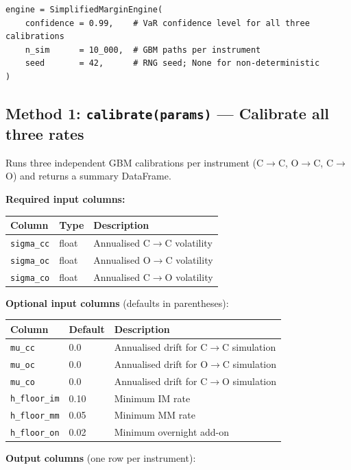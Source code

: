 \documentclass[9pt, a4paper]{extarticle}
\begin{document}
\begin{lstlisting}
engine = SimplifiedMarginEngine(
    confidence = 0.99,    # VaR confidence level for all three calibrations
    n_sim      = 10_000,  # GBM paths per instrument
    seed       = 42,      # RNG seed; None for non-deterministic
)
\end{lstlisting}

\subsection{Method 1: \texttt{calibrate(params)} — Calibrate all three rates}

Runs three independent GBM calibrations per instrument (C$\to$C, O$\to$C,
C$\to$O) and returns a summary DataFrame.

\textbf{Required input columns:}

\begin{tabularx}{\linewidth}{llX}
\toprule
\textbf{Column} & \textbf{Type} & \textbf{Description} \\
\midrule
\texttt{sigma\_cc} & float & Annualised C$\to$C volatility \\
\texttt{sigma\_oc} & float & Annualised O$\to$C volatility \\
\texttt{sigma\_co} & float & Annualised C$\to$O volatility \\
\bottomrule
\end{tabularx}

\textbf{Optional input columns} (defaults in parentheses):

\begin{tabularx}{\linewidth}{llX}
\toprule
\textbf{Column} & \textbf{Default} & \textbf{Description} \\
\midrule
\texttt{mu\_cc}      & 0.0  & Annualised drift for C$\to$C simulation \\
\texttt{mu\_oc}      & 0.0  & Annualised drift for O$\to$C simulation \\
\texttt{mu\_co}      & 0.0  & Annualised drift for C$\to$O simulation \\
\texttt{h\_floor\_im} & 0.10 & Minimum IM rate \\
\texttt{h\_floor\_mm} & 0.05 & Minimum MM rate \\
\texttt{h\_floor\_on} & 0.02 & Minimum overnight add-on \\
\bottomrule
\end{tabularx}

\textbf{Output columns} (one row per instrument):
\end{document}
